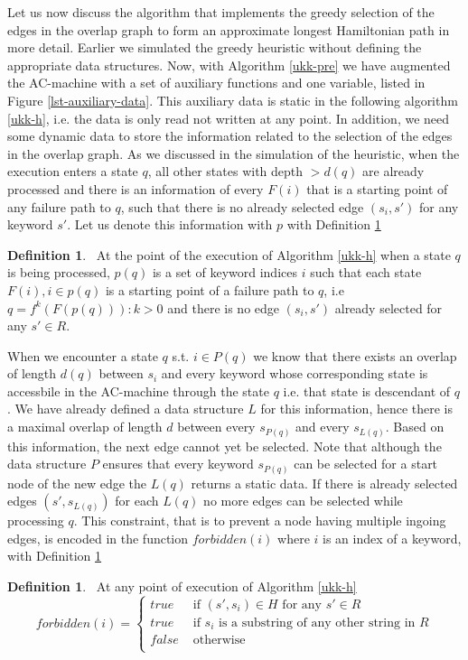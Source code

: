 \documentclass[english,twoside,censored,csm,algorithms-track-2020]{HYthesisML}
\theoremstyle{plain}
\theoremstyle{definition}
\newtheorem{definition}[theorem]{Definition}
\begin{document}
Let us now discuss the algorithm that implements the greedy selection of the edges in the
overlap graph to form an approximate longest Hamiltonian path in more detail. Earlier we simulated
the greedy heuristic without defining the appropriate data structures. Now, with Algorithm
\ref{ukk-pre} we have augmented the AC-machine with a set of auxiliary functions and one variable,
listed in Figure \ref{lst-auxiliary-data}.
This auxiliary data is static in the following algorithm \ref{ukk-h}, i.e. the data is only read
not written at any point. In addition, we need some dynamic data to store the information
related to the selection of the edges in the overlap graph. As we discussed in the simulation
of the heuristic, when the execution enters a state $q$, all other states with depth $>d(q)$ are
already processed and there is an information of every $F(i)$ that is a starting point of any failure
path to $q$,
such that there is no already selected edge $(s_i, s')$ for any keyword $s'$. Let us denote
this information with $p$ with Definition \ref{def-p}

\begin{definition}~\label{def-p}
  At the point of the execution of Algorithm \ref{ukk-h} when a state $q$ is being processed,
  $p(q)$ is a set of keyword indices $i$ such that each state $ F(i), i\in p(q)$ is
  a starting point of a failure path to $q$, i.e $q = f^k(F(p(q))) : k>0$ and there is no
  edge $(s_i, s')$ already selected for any $s'\in R$.
\end{definition}

When we encounter a state $q$ s.t. $i\in P(q)$ we know that there exists an overlap of length
$d(q)$ between $s_i$ and every keyword whose corresponding state is accessbile in the AC-machine
through the state $q$ i.e. that state is descendant of $q$. We have already defined a data structure
$L$ for this information, hence there is a maximal overlap of length $d$ between every $s_{P(q)}$
and every $s_{L(q)}$. Based on this information, the next edge cannot yet be selected.
Note that although the data structure $P$ ensures that every keyword $s_{P(q)}$ can be selected
for a start node of the new edge the $L(q)$ returns a static data. If there is already selected
edges $(s',s_{L(q)})$ for each $L(q)$ no more edges can be selected while processing $q$.
This constraint, that is to prevent a node having multiple ingoing edges, is encoded in the
function $forbidden(i)$ where $i$ is an index of a keyword,
with Definition \ref{def-forbidden}

\begin{definition}~\label{def-forbidden}
  At any point of execution of Algorithm \ref{ukk-h}
  \[
  forbidden(i) =
  \begin{cases}
    true &\text{ if }  (s',s_i)\in H \text{ for any } s'\in R \\
    true &\text{ if }  s_i \text{ is a substring of any other string in } R \\
    false &\text{ otherwise} \\
  \end{cases}
  \]
\end{definition}
\end{document}
